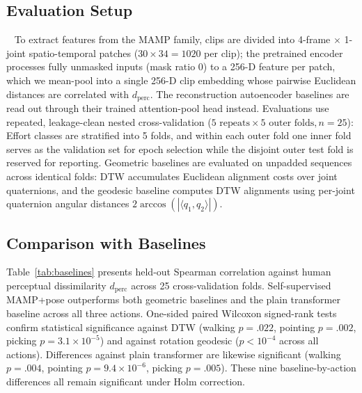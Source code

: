 \documentclass[letterpaper]{article} %
\begin{document}
\subsection{Evaluation Setup}~\label{sec:evaluation-setup}
To extract features from the MAMP family, clips are divided into 4-frame $\times$ 1-joint spatio-temporal patches
($30 \times 34 = 1020$ per clip); the pretrained encoder processes fully unmasked inputs (mask ratio 0)
to a 256-D feature per patch, which we mean-pool into a single 256-D clip embedding whose pairwise
Euclidean distances are correlated with $d_{\text{perc}}$. The reconstruction autoencoder baselines are
read out through their trained attention-pool head instead. Evaluations use repeated, leakage-clean
nested cross-validation ($5\text{ repeats}\times 5\text{ outer folds}, n=25$): Effort classes are
stratified into 5 folds, and within each outer fold one inner fold serves as the validation set for
epoch selection while the disjoint outer test fold is reserved for reporting. Geometric baselines are
evaluated on unpadded sequences across identical folds: DTW accumulates Euclidean
alignment costs over joint quaternions, and the geodesic baseline computes DTW alignments using
per-joint quaternion angular distances $2\arccos(|\langle q_1,q_2\rangle|)$.

\subsection{Comparison with Baselines}
Table~\ref{tab:baselines} presents held-out Spearman correlation against human perceptual dissimilarity
$d_{\text{perc}}$ across 25 cross-validation folds. Self-supervised MAMP+pose outperforms both geometric baselines and the plain transformer baseline
across all three actions. One-sided paired Wilcoxon signed-rank tests confirm statistical
significance against DTW (walking $p=.022$, pointing $p=.002$, picking $p=3.1\times 10^{-5}$)
and against rotation geodesic ($p < 10^{-4}$ across all actions). Differences against plain transformer are likewise significant (walking $p=.004$, pointing $p=9.4\times 10^{-6}$, picking
$p=.005$). These nine baseline-by-action differences all remain significant under Holm correction.
\end{document}

